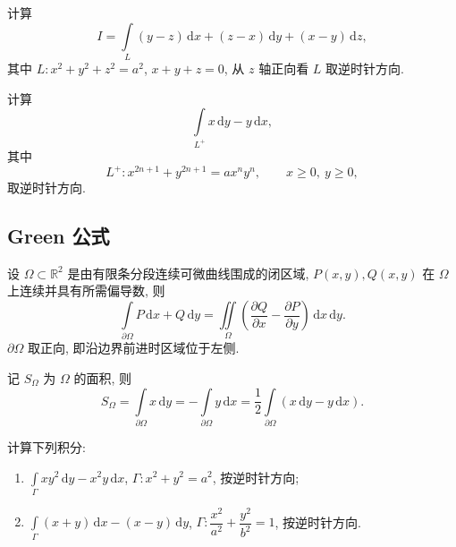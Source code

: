 \documentclass[../数学分析培优讲义.tex]{subfiles}
\begin{document}
\begin{example}
计算
\[
    I=\int\limits_L(y-z)\,\mathrm{d}x+(z-x)\,\mathrm{d}y+(x-y)\,\mathrm{d}z,
\]
其中 $L:x^2+y^2+z^2=a^2$, $x+y+z=0$, 从 $z$ 轴正向看 $L$ 取逆时针方向.
\end{example}
\exampleblank

\begin{example}
计算
\[
    \int\limits_{L^+}x\,\mathrm{d}y-y\,\mathrm{d}x,
\]
其中
\[
    L^+:x^{2n+1}+y^{2n+1}=ax^ny^n,\qquad x\geq0,\ y\geq0,
\]
取逆时针方向.
\end{example}
\exampleblank


\newpage

\subsection{Green 公式}

\begin{theorem}
\leavevmode\par\noindent
设 $\Omega\subset\mathbb{R}^2$ 是由有限条分段连续可微曲线围成的闭区域, $P(x,y),Q(x,y)$ 在 $\Omega$ 上连续并具有所需偏导数, 则
\[
    \int\limits_{\partial\Omega}P\,\mathrm{d}x+Q\,\mathrm{d}y
    =\iint\limits_\Omega\left(\dfrac{\partial Q}{\partial x}-\dfrac{\partial P}{\partial y}\right)\,\mathrm{d}x\,\mathrm{d}y.
\]
$\partial\Omega$ 取正向, 即沿边界前进时区域位于左侧.
\end{theorem}

\begin{corollary}[\markstar]
记 $S_\Omega$ 为 $\Omega$ 的面积, 则
\[
    S_\Omega
    =\int\limits_{\partial\Omega}x\,\mathrm{d}y
    =-\int\limits_{\partial\Omega}y\,\mathrm{d}x
    =\dfrac{1}{2}\int\limits_{\partial\Omega}(x\,\mathrm{d}y-y\,\mathrm{d}x).
\]
\end{corollary}

\begin{example}
计算下列积分:
\begin{enumerate}[label=(\arabic*)]
    \item $\displaystyle\int\limits_\Gamma xy^2\,\mathrm{d}y-x^2y\,\mathrm{d}x$, $\Gamma:x^2+y^2=a^2$, 按逆时针方向;
    \item $\displaystyle\int\limits_\Gamma(x+y)\,\mathrm{d}x-(x-y)\,\mathrm{d}y$, $\Gamma:\dfrac{x^2}{a^2}+\dfrac{y^2}{b^2}=1$, 按逆时针方向.
\end{enumerate}
\end{example}
\exampleblank
\end{document}
